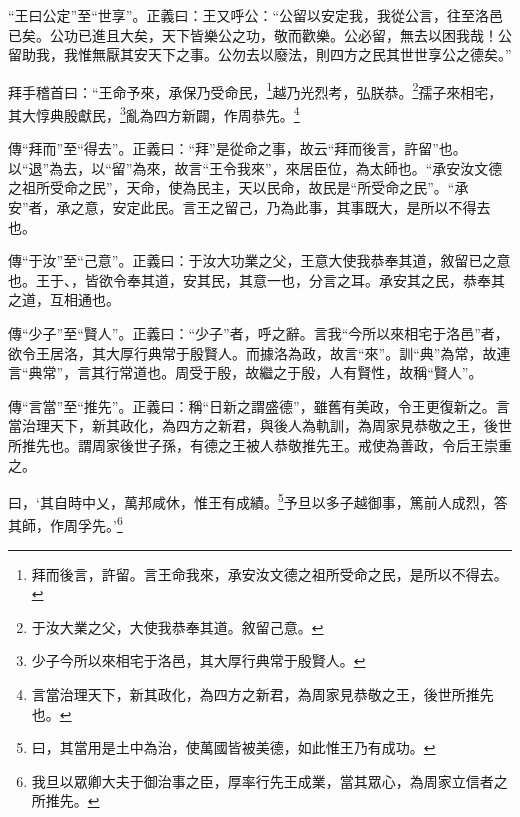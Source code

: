 {\noindent\shu{}\fzkt “王曰公定”至“世享”。正義曰：王又呼公：“公留以安定我，我從公言，往至洛邑已矣。公功已進且大矣，天下皆樂公之功，敬而歡樂。公必留，無去以困我哉！公留助我，我惟無厭其安天下之事。公勿去以廢法，則四方之民其世世享公之德矣。” \par}

拜手稽首曰：“王命予來，承保乃受命民，\footnote{拜而後言，許留。言王命我來，承安汝文德之祖所受命之民，是所以不得去。}越乃光烈考，弘朕恭。\footnote{于汝大業之父，大使我恭奉其道。敘留己意。}孺子來相宅，其大惇典殷獻民，\footnote{少子今所以來相宅于洛邑，其大厚行典常于殷賢人。}亂為四方新闢，作周恭先。\footnote{言當治理天下，新其政化，為四方之新君，為周家見恭敬之王，後世所推先也。}


{\noindent\zhuan{}\fzbyks 傳“拜而”至“得去”。正義曰：“拜”是從命之事，故云“拜而後言，許留”也。以“退”為去，以“留”為來，故言“王令我來”，來居臣位，為太師也。“承安汝文德之祖所受命之民”，天命，使為民主，天以民命，故民是“所受命之民”。“承安”者，承之意，安定此民。言王之留己，乃為此事，其事既大，是所以不得去也。 \par}

{\noindent\zhuan{}\fzbyks 傳“于汝”至“己意”。正義曰：于汝大功業之父，王意大使我恭奉其道，敘留已之意也。王于、，皆欲令奉其道，安其民，其意一也，分言之耳。承安其之民，恭奉其之道，互相通也。 \par}

{\noindent\zhuan{}\fzbyks 傳“少子”至“賢人”。正義曰：“少子”者，呼之辭。言我“今所以來相宅于洛邑”者，欲令王居洛，其大厚行典常于殷賢人。而據洛為政，故言“來”。訓“典”為常，故連言“典常”，言其行常道也。周受于殷，故繼之于殷，人有賢性，故稱“賢人”。 \par}

{\noindent\zhuan{}\fzbyks 傳“言當”至“推先”。正義曰：稱“日新之謂盛德”，雖舊有美政，令王更復新之。言當治理天下，新其政化，為四方之新君，與後人為軌訓，為周家見恭敬之王，後世所推先也。謂周家後世子孫，有德之王被人恭敬推先王。戒使為善政，令后王崇重之。 \par}

曰，‘其自時中乂，萬邦咸休，惟王有成績。\footnote{曰，其當用是土中為治，使萬國皆被美德，如此惟王乃有成功。}予旦以多子越御事，篤前人成烈，答其師，作周孚先。’\footnote{我旦以眾卿大夫于御治事之臣，厚率行先王成業，當其眾心，為周家立信者之所推先。}

